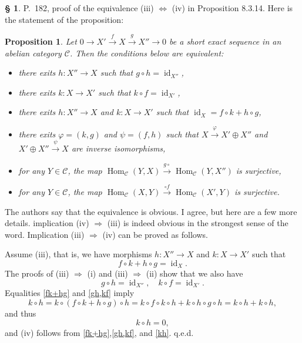 \documentclass[12pt]{article}%
\newtheorem{prop}[thm]{Proposition}
\theoremstyle{remark}
\theoremstyle{definition}
\newtheorem{s}[thm]{\S}%
\newcommand{\C}{\mathcal C}
\newcommand{\pp}{\varphi}
\newcommand{\ssi}{\Leftrightarrow}%
\newcommand{\then}{\Rightarrow}
\newcommand{\xr}{\xrightarrow}
\DeclareMathOperator{\id}{id}
\DeclareMathOperator{\Hom}{Hom}%
\begin{document}
\begin{s} 
P.~182, proof of the equivalence (iii) $\ssi$ (iv) in Proposition 8.3.14. Here is the statement of the proposition:

\begin{prop}
Let $0\to X'\xr fX\xr gX''\to0$ be a short exact sequence in an abelian category $\C$. Then the conditions below are equivalent:
\begin{itemize}
\item[\em(i)] there exits $h:X''\to X$ such that $g\circ h=\id_{X''}$,
\item[\em(ii)] there exits $k:X\to X'$ such that $k\circ f=\id_{X'}$,
\item[\em(iii)] there exits $h:X''\to X$ and $k:X\to X'$ such that $\id_X=f\circ k+h\circ g$,
\item[\em(iv)] there exits $\pp=(k,g)$ and $\psi=(f,h)$ such that $X\xr\pp X'\oplus X''$ and $X'\oplus X''\xr\psi X$ are inverse isomorphisms,
\item[\em(v)] for any $Y\in\C$, the map $\Hom_\C(Y,X)\xr{g\circ}\Hom_\C(Y,X'')$ is surjective,
\item[\em(vi)] for any $Y\in\C$, the map $\Hom_\C(X,Y)\xr{\circ f}\Hom_\C(X',Y)$ is surjective.
\end{itemize}
\end{prop}

The authors say that the equivalence is obvious. I agree, but here are a few more details. implication (iv) $\then$ (iii) is indeed obvious in the strongest sense of the word. Implication (iii) $\then$ (iv) can be proved as follows. 

Assume (iii), that is, we have morphisms $h:X''\to X$ and $k:X\to X'$ such that 
\begin{equation}\label{fk+hg} 
f\circ k+h\circ g=\id_X.
\end{equation} 
The proofs of (iii) $\then$ (i) and (iii) $\then$ (ii) show that we also have 
\begin{equation}\label{gh,kf} 
g\circ h=\id_{X''},\quad k\circ f=\id_{X'}.
\end{equation} 
Equalities \eqref{fk+hg} and \eqref{gh,kf} imply 
$$
k\circ h=k\circ(f\circ k+h\circ g)\circ h=k\circ f\circ k\circ h+k\circ h\circ g\circ h=k\circ h+k\circ h,
$$ 
and thus 
\begin{equation}\label{kh} 
k\circ h=0, 
\end{equation} 
and (iv) follows from \eqref{fk+hg},\eqref{gh,kf}, and \eqref{kh}. q.e.d.
\end{s}
\end{document}
